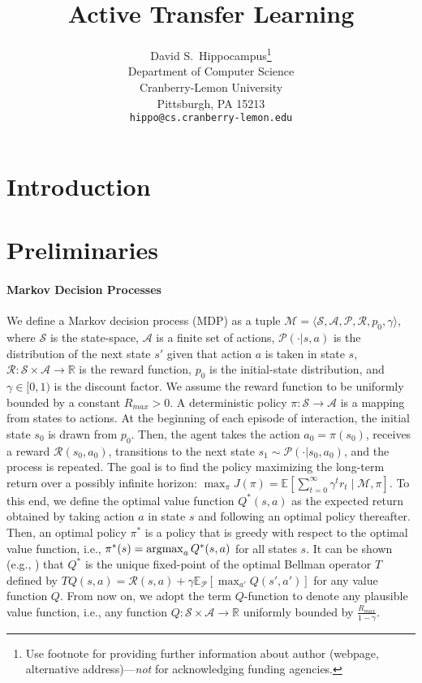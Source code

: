 \documentclass{article}
\title{Active Transfer Learning}
\author{
  David S.~Hippocampus\thanks{Use footnote for providing further
    information about author (webpage, alternative
    address)---\emph{not} for acknowledging funding agencies.} \\
  Department of Computer Science\\
  Cranberry-Lemon University\\
  Pittsburgh, PA 15213 \\
  \texttt{hippo@cs.cranberry-lemon.edu} \\
}
\newcommand{\argmax}{\operatornamewithlimits{argmax}}
\begin{document}

\maketitle

\begin{abstract}
\end{abstract}

\section{Introduction}

\section{Preliminaries}

\paragraph{Markov Decision Processes}
We define a Markov decision process (MDP) as a tuple $\mathcal{M} = \langle \mathcal{S},\mathcal{A},\mathcal{P},\mathcal{R},p_0,\gamma\rangle$, where $\mathcal{S}$ is the state-space, $\mathcal{A}$ is a finite set of actions, $\mathcal{P}(\cdot | s,a)$ is the distribution of the next state $s'$ given that action $a$ is taken in state $s$, $\mathcal{R}: \mathcal{S}\times\mathcal{A}\rightarrow\mathbb{R}$ is the reward function, $p_0$ is the initial-state distribution, and $\gamma\in [0,1)$ is the discount factor. We assume the reward function to be uniformly bounded by a constant $R_{max}>0$. A deterministic policy $\pi : \mathcal{S} \rightarrow \mathcal{A}$ is a mapping from states to actions. At the beginning of each episode of interaction, the initial state $s_0$ is drawn from $p_0$. Then, the agent takes the action $a_0 = \pi(s_0)$, receives a reward $\mathcal{R}(s_0,a_0)$, transitions to the next state $s_1 \sim \mathcal{P}(\cdot | s_0,a_0)$, and the process is repeated. The goal is to find the policy maximizing the long-term return over a possibly infinite horizon: $\max_{\pi}J(\pi)=\mathbb{E}[\sum_{t=0}^{\infty} \gamma^t r_t \mid \mathcal{M},\pi]$. To this end, we define the optimal value function $Q^*(s,a)$ as the expected return obtained by taking action $a$ in state $s$ and following an optimal policy thereafter. Then, an optimal policy $\pi^*$ is a policy that is greedy with respect to the optimal value function, i.e., $\pi^*(s) = \argmax_a Q^*(s,a)$ for all states $s$. It can be shown (e.g., \cite{puterman1994markov}) that $Q^*$ is the unique fixed-point of the optimal Bellman operator $T$ defined by $TQ(s,a) = \mathcal{R}(s,a) + \gamma\mathbb{E}_{\mathcal{P}}[\max_{a'}Q(s',a')]$ for any value function $Q$. From now on, we adopt the term $Q$-function to denote any plausible value function, i.e., any function $Q : \mathcal{S}\times\mathcal{A} \rightarrow \mathbb{R}$ uniformly bounded by $\frac{R_{max}}{1-\gamma}$.
\end{document}
